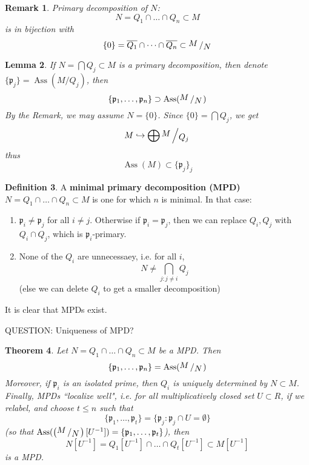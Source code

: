 \documentclass[12pt]{article}
\DeclareMathOperator{\Ass}{Ass}
\newcommand{\bigslant}[2]{{\raisebox{.2em}{$#1$}\left/\raisebox{-.2em}{$#2$}\right.}}
\def\p{\mathfrak{p}}
\newtheorem{theorem}{Theorem}
\newtheorem{lemma}[theorem]{Lemma}
\newtheorem{remark}[theorem]{Remark}
\theoremstyle{definition}
\newtheorem{definition}[theorem]{Definition}
\begin{document}
\begin{remark}
Primary decomposition of $N$: 
\[
N = Q_1 \cap \dots \cap Q_n \subset M 
\]
is in bijection with 
\[
\{0\} = \overline{Q_1} \cap \dots \cap \overline{Q_n} \subset \bigslant{M}{N}
\]
\end{remark}
\begin{lemma}
If $N = \bigcap Q_j \subset M$ is a primary decomposition, then denote $\{\p_j\} = \Ass(M/Q_j)$, then
\[
\{\p_1,\dots ,\p_n\} \supset \Ass(\bigslant{M}{N})
\]
By the Remark, we may assume $N = \{0\}$. Since $\{0\} = \bigcap Q_j$, we get 
\[
M \hookrightarrow \bigoplus \bigslant{M}{Q_j}
\]
thus 
\[
\Ass(M) \subset \{\p_j\}_j
\]
\end{lemma}
\begin{definition}
A \textbf{minimal primary decomposition (MPD)} $N = Q_1 \cap \dots \cap Q_n \subset M$ is one for which $n$ is minimal. In that case:
\begin{enumerate}
    \item $\p_i \neq \p_j$ for all $i\neq j$. Otherwise if $\p_i=\p_j$, then we can replace $Q_i,Q_j$ with $Q_i\cap Q_j$, which is $\p_i$-primary. 
    \item None of the $Q_i$ are unnecessaey, i.e. for all $i$, 
    \[
    N \neq \bigcap_{j:j\neq i} Q_j
    \]
    (else we can delete $Q_i$ to get a smaller decomposition)
\end{enumerate}
It is clear that MPDs exist.
\end{definition}
QUESTION: Uniqueness of MPD?
\begin{theorem}
Let $N = Q_1 \cap \dots \cap Q_n \subset M$ be a MPD. Then 
\[
\{\p_1, \dots ,\p_n\} = \Ass(\bigslant{M}{N})
\]
Moreover, if $\p_i$ is an isolated prime, then $Q_i$ is uniquely determined by $N\subset M$.\\
Finally, MPDs ``localize well", i.e. for all multiplicatively closed set $U\subset R$, if we relabel, and choose $t\leq n$ such that 
\[
\{\p_1,\dots ,\p_t\} = \{\p_j: \p_j\cap U = \emptyset\}
\]
(so that $\Ass(\left(\bigslant{M}{N}\right)[U^{-1}]) = \{\p_1,\dots ,\p_t\}$), then 
\[
N[U^{-1}] = Q_1[U^{-1}] \cap \dots \cap  Q_t[U^{-1}] \subset M[U^{-1}]
\]
is a MPD.
\end{theorem}
\end{document}
